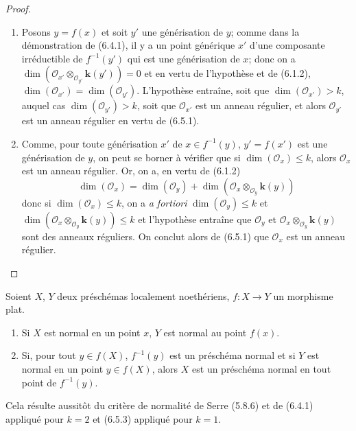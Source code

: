 \begin{proof}
\medskip\noindent
\begin{enumerate}
\item[(i)] Posons $y=f(x)$ et soit $y'$ une générisation de $y$; comme
dans la démonstration de (6.4.1), il y a un point générique $x'$ d'une
composante irréductible de $f^{-1}(y')$ qui est une générisation de $x$;
donc on a
$\dim(\mathcal O_{x'}\otimes_{\mathcal O_{y'}}\boldsymbol{k}(y'))=0$
et en vertu de l'hypothèse et de (6.1.2),
$\dim(\mathcal O_{x'})=\dim(\mathcal O_{y'})$.
L'hypothèse entraîne, soit que
$\dim(\mathcal O_{x'})>k$, auquel cas
$\dim(\mathcal O_{y'})>k$, soit que $\mathcal O_{x'}$ est un anneau
régulier, et alors $\mathcal O_{y'}$ est un anneau régulier en vertu de
(6.5.1).

\item[(ii)] Comme, pour toute générisation $x'$ de $x\in f^{-1}(y)$,
$y'=f(x')$ est une générisation de $y$, on peut se borner à vérifier que
si $\dim(\mathcal O_x)\leqslant k$, alors $\mathcal O_x$ est un anneau
régulier. Or, on a, en vertu de (6.1.2)
\[
\dim(\mathcal O_x)=\dim(\mathcal O_y)
+\dim(\mathcal O_x\otimes_{\mathcal O_y}\boldsymbol{k}(y))
\]
donc si $\dim(\mathcal O_x)\leqslant k$, on a \emph{a fortiori}
$\dim(\mathcal O_y)\leqslant k$ et
$\dim(\mathcal O_x\otimes_{\mathcal O_y}\boldsymbol{k}(y))\leqslant k$ et l'hypothèse
entraîne que $\mathcal O_y$ et
$\mathcal O_x\otimes_{\mathcal O_y}\boldsymbol{k}(y)$ sont des anneaux réguliers. On
conclut alors de (6.5.1) que $\mathcal O_x$ est un anneau régulier.
\end{enumerate}
\end{proof}

\begin{corollary}[6.5.4]
\label{IV.2.s6.5.4-fr}
Soient $X$, $Y$ deux préschémas localement noethériens, $f:X\to Y$
un morphisme plat.
\begin{enumerate}
\item[\textup{(i)}] Si $X$ est normal en un point $x$, $Y$ est normal au point
$f(x)$.
\item[\textup{(ii)}] Si, pour tout $y\in f(X)$, $f^{-1}(y)$ est un préschéma
normal et si $Y$ est normal en un point $y\in f(X)$, alors $X$ est un
préschéma normal en tout point de $f^{-1}(y)$.
\end{enumerate}
\end{corollary}

Cela résulte aussitôt du critère de normalité de Serre (5.8.6) et de
(6.4.1) appliqué pour $k=2$ et (6.5.3) appliqué pour $k=1$.

